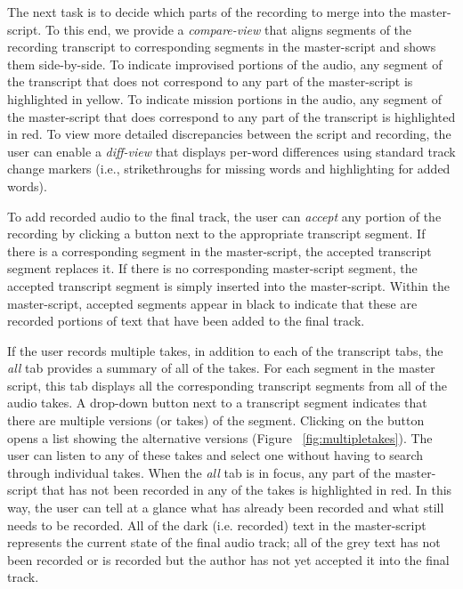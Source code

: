The next task is to decide which parts of the recording to merge into the master-script. To this end, we provide a \textit{compare-view} that aligns segments of the recording transcript to corresponding segments in the master-script and shows them side-by-side. To indicate improvised portions of the audio, any segment of the transcript that does not correspond to any part of the master-script is highlighted in yellow. To indicate mission portions in the audio, any segment of the master-script that does correspond to any part of the transcript is highlighted in red. To
view more detailed discrepancies between the script and recording, the
user can enable a \textit{diff-view} that displays per-word differences
using standard track change markers (i.e., strikethroughs for
missing words and highlighting for added words). 

To add recorded audio to the final track, the user can \textit{accept} any portion of the recording by clicking a button next to the appropriate transcript segment. If there is a corresponding segment in the master-script, the accepted transcript segment replaces it. If there is no corresponding master-script segment, the accepted transcript segment is simply inserted into the master-script. Within the master-script, accepted segments appear in black to indicate that these are recorded portions of text that have been added to the final track. 


If the user records multiple takes, in addition to each of the transcript tabs, the \textit{all} tab provides a summary of all of the takes. For each segment in the master script, this tab displays all the corresponding transcript segments from all of the audio takes. A drop-down button next to a transcript segment  indicates that there are multiple versions (or takes)  of the  segment. Clicking on the button opens a list showing the alternative versions (Figure ~\ref{fig:multipletakes}). The user can listen to any of these takes and select one without having to search through individual takes. 
When the \textit{all} tab is in focus, any part of the master-script that has not been recorded in any of the takes is highlighted in red. In this way, the user can tell at a glance what has already been recorded and what still needs to be recorded. All of the dark (i.e. recorded) text in the master-script represents the current state of the final audio track; all of the grey text has not been recorded or is recorded but the author has not yet accepted it into the final track. 

